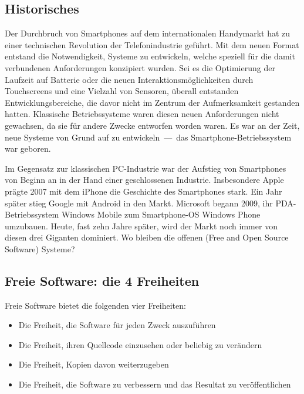 \subsection{Historisches}
Der Durchbruch von Smartphones auf dem internationalen Handymarkt hat zu einer technischen Revolution der Telefonindustrie geführt. Mit dem neuen Format entstand die Notwendigkeit, Systeme zu entwickeln, welche speziell für die damit verbundenen Anforderungen konzipiert wurden. Sei es die Optimierung der Laufzeit auf Batterie oder die neuen Interaktionsmöglichkeiten durch Touchscreens und eine Vielzahl von Sensoren, überall entstanden Entwicklungsbereiche, die davor nicht im Zentrum der Aufmerksamkeit gestanden hatten. Klassische Betriebssysteme waren diesen neuen Anforderungen nicht gewachsen, da sie für andere Zwecke entworfen worden waren. Es war an der Zeit, neue Systeme von Grund auf zu \mbox{entwickeln --- das} \mbox{Smartphone-Betriebssystem} war geboren.

Im Gegensatz zur klassischen \mbox{PC-Industrie} war der Aufstieg von Smartphones von Beginn an in der Hand einer geschlossenen Industrie. Insbesondere Apple prägte 2007 mit dem iPhone die Geschichte des Smartphones stark. Ein Jahr später stieg Google mit Android in den Markt. Microsoft begann 2009, ihr \mbox{PDA-Betriebssystem} Windows Mobile zum \mbox{Smartphone-OS} Windows Phone umzubauen. Heute, fast zehn Jahre später, wird der Markt noch immer von diesen drei Giganten dominiert. Wo bleiben die offenen (Free and Open Source Software) Systeme?
\newline

\subsection{Freie Software: die 4 Freiheiten}
Freie Software bietet die folgenden vier Freiheiten\thinspace\cite{online:fsf_vier-freiheiten}:
\begin{itemize}
	\renewcommand\labelitemi{--}
	\item Die Freiheit, die Software für jeden Zweck auszuführen
	\item  Die Freiheit, ihren Quellcode einzusehen oder beliebig zu verändern
	\item Die Freiheit, Kopien davon weiterzugeben
	\item Die Freiheit, die Software zu verbessern und das Resultat zu veröffentlichen
\end{itemize}
\mbox{}

